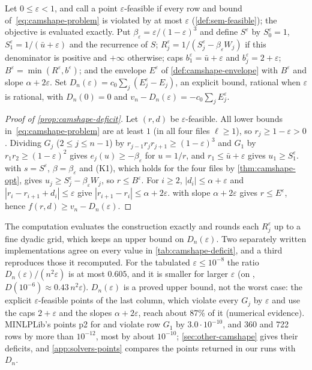 Let $0 \le \varepsilon < 1$, and call a point $\varepsilon$-feasible if every row and bound of~\eqref{eq:camshape-problem} is violated by at most $\varepsilon$ (\cref{def:sem-feasible}); the objective is evaluated exactly.
Put $\beta_\varepsilon = \varepsilon/(1-\varepsilon)^3$ and define $S^\varepsilon$ by $S^\varepsilon_0 = 1$, $S^\varepsilon_1 = 1/(\bar u + \varepsilon)$ and the recurrence of $S$; $R^\varepsilon_j = 1/(S^\varepsilon_j - \beta_\varepsilon W_j)$ if this denominator is positive and $+\infty$ otherwise; caps $b^\varepsilon_1 = \bar u + \varepsilon$ and $b^\varepsilon_j = 2 + \varepsilon$; $B^\varepsilon = \min(R^\varepsilon, b^\varepsilon)$; and the envelope $E^\varepsilon$ of \cref{def:camshape-envelope} with $B^\varepsilon$ and slope $\alpha + 2\varepsilon$.
Set $D_n(\varepsilon) = c_0\sum_j(E^\varepsilon_j - E_j)$, an explicit bound, rational when $\varepsilon$ is rational, with $D_n(0) = 0$ and $v_n - D_n(\varepsilon) = -c_0\sum_j E^\varepsilon_j$.

\begin{proof}[Proof of \cref{prop:camshape-deficit}]
Let $(r,d)$ be $\varepsilon$-feasible.
All lower bounds in~\eqref{eq:camshape-problem} are at least $1$ (in all four files $\ell \ge 1$), so $r_j \ge 1 - \varepsilon > 0$.
Dividing $G_j$ ($2 \le j \le n-1$) by $r_{j-1}r_jr_{j+1} \ge (1-\varepsilon)^3$ and $G_1$ by $r_1r_2 \ge (1-\varepsilon)^2$ gives $e_j(u) \ge -\beta_\varepsilon$ for $u = 1/r$, and $r_1 \le \bar u + \varepsilon$ gives $u_1 \ge S^\varepsilon_1$.
 with $s = S^\varepsilon$, $\beta = \beta_\varepsilon$ and (K1), which holds for the four files by \cref{thm:camshape-opt}, gives $u_j \ge S^\varepsilon_j - \beta_\varepsilon W_j$, so $r \le B^\varepsilon$.
For $i \ge 2$, $|d_i| \le \alpha + \varepsilon$ and $|r_i - r_{i+1} + d_i| \le \varepsilon$ give $|r_{i+1} - r_i| \le \alpha + 2\varepsilon$.
 with slope $\alpha + 2\varepsilon$ gives $r \le E^\varepsilon$, hence $f(r,d) \ge v_n - D_n(\varepsilon)$.
\end{proof}

The computation evaluates the construction exactly and rounds each $R^\varepsilon_j$ up to a fine dyadic grid, which keeps an upper bound on $D_n(\varepsilon)$.
Two separately written implementations agree on every value in \cref{tab:camshape-deficit}, and a third reproduces those it recomputed.
For the tabulated $\varepsilon \le 10^{-8}$ the ratio $D_n(\varepsilon)/(n^2\varepsilon)$ is at most $0.605$, and it is smaller for larger $\varepsilon$ (on , $D(10^{-6}) \approx 0.43\,n^2\varepsilon$).
$D_n(\varepsilon)$ is a proved upper bound, not the worst case: the explicit $\varepsilon$-feasible points of the last column, which violate every $G_j$ by $\varepsilon$ and use the caps $2 + \varepsilon$ and the slopes $\alpha + 2\varepsilon$, reach about 87\% of it (numerical evidence).
MINLPLib's points p2 for  and  violate row $G_1$ by $3.0\cdot10^{-10}$, and 360 and 722 rows by more than $10^{-12}$, most by about $10^{-10}$; \cref{sec:other-camshape} gives their deficits, and \cref{app:solvers-points} compares the points returned in our runs with $D_n$.

